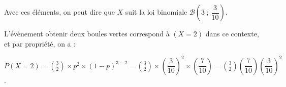 \documentclass[10pt]{article}
\begin{document}
\begin{enumerate}
Avec ces éléments, on peut dire que $X$ suit la loi binomiale $ \mathcal{B}\left(3 ~;~ \dfrac{3}{10}\right)$.

L'évènement \og obtenir deux boules vertes\fg{} correspond à $(X = 2)$ dans ce contexte, et par propriété, on a :

	$\displaystyle P(X = 2) = \binom{3}{2}\times p^2\times \left(1 - p\right)^{3-2} = \binom{3}{2}\times \left(\dfrac{3}{10}\right)^2\times \left(\dfrac{7}{10}\right) = \binom{3}{2}\left(\dfrac{7}{10}\right) \left(\dfrac{3}{10}\right)^2$.
\end{enumerate}
\bigskip
\end{document}
